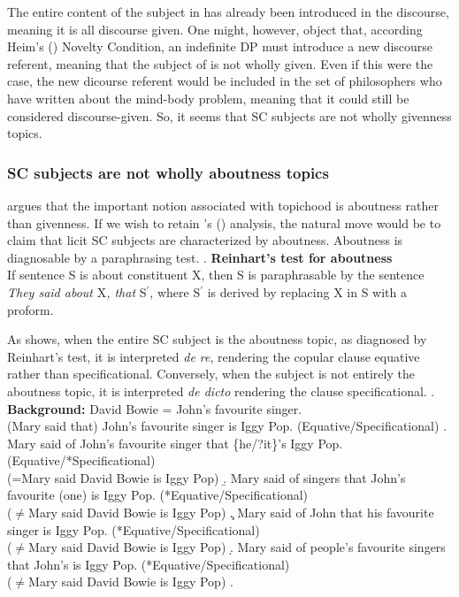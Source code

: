 \documentclass[
	letterpaper,
]{article}
\begin{document}
The entire content of the subject in \Last[a] has already been introduced in the discourse, meaning it is all discourse given.
One might, however, object that, according Heim's (\citeyear{heim1982semantics}) Novelty Condition, an indefinite DP must introduce a new discourse referent, meaning that the subject of \Last[a] is not wholly given.
Even if this were the case, the new dicourse referent would be included in the set of philosophers who have written about the mind-body problem, meaning that it could still be considered discourse-given.
So, it seems that SC subjects are not wholly givenness topics.
\subsubsection{SC subjects are not wholly aboutness topics}
\textcite{reinhart1981pragmatics} argues that the important notion associated with topichood is aboutness rather than givenness.
If we wish to retain \citeauthor{mikkelsen2005copular}'s (\citeyear{mikkelsen2005copular}) analysis, the natural move would be to claim that licit SC subjects are characterized by aboutness.
Aboutness is diagnosable by a paraphrasing test.
\ex. \textbf{Reinhart's test for aboutness}\\
If sentence S is about constituent X, then S is paraphrasable by the sentence \textit{They said about }X\textit{, that }S$^\prime$, where S$^\prime$ is derived by replacing X in S with a proform.

As \Next shows, when the entire SC subject is the aboutness topic, as diagnosed by Reinhart's test, it is interpreted \textit{de re}, rendering the copular clause equative rather than specificational.
Conversely, when the subject is not entirely the aboutness topic, it is interpreted \textit{de dicto} rendering the clause specificational.
\ex. \textbf{Background:} David Bowie = John's favourite singer.\\
(Mary said that) John's favourite singer is Iggy Pop. (Equative/Specificational)
\a. Mary said of John's favourite singer that \{he/?it\}'s Iggy Pop.(Equative/*Specificational)\\
(=Mary said David Bowie is Iggy Pop)
\b. Mary said of singers that John's favourite (one) is Iggy Pop. (*Equative/Specificational)\\
($\neq$Mary said David Bowie is Iggy Pop)
\c. Mary said of John that his favourite singer is Iggy Pop. (*Equative/Specificational)\\
($\neq$Mary said David Bowie is Iggy Pop)
\d. Mary said of people's favourite singers that John's is Iggy Pop. (*Equative/Specificational)\\
($\neq$Mary said David Bowie is Iggy Pop)
\z.
\end{document}
